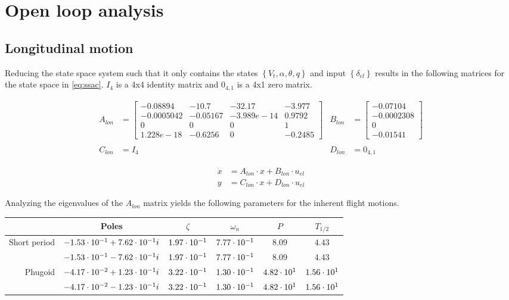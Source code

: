 \section{Open loop analysis}
\subsection{Longitudinal motion}
Reducing the state space system such that it only contains the states $\left \{ V_t, \alpha, \theta, q \right \}$ and input $\left \{ \delta_{el} \right \}$ results in the following matrices for the state space in \autoref{eq:ssac}. $I_4$ is a 4x4 identity matrix and $0_{4,1}$ is a 4x1 zero matrix.

\begin{align*}
    A_{lon}&=\begin{bmatrix}
        -0.08894   &  -10.7   &   -32.17   & -3.977 \\
        -0.0005042 & -0.05167 & -3.989e-14 &   0.9792 \\
                 0 &        0 &          0 &        1 \\
         1.228e-18 &  -0.6256 &          0 &  -0.2485
    \end{bmatrix} &
    B_{lon}&=\begin{bmatrix}
          -0.07104 \\
        -0.0002308 \\
                 0 \\
          -0.01541 
    \end{bmatrix} \\\\
    C_{lon}&=I_4 &
    D_{lon}&=0_{4,1}
\end{align*}

\begin{align}    
    \dot{x} &= A_{lon} \cdot x + B_{lon} \cdot u_{el} \nonumber\\
    y &= C_{lon} \cdot x + D_{lon} \cdot u_{el} \label{eq:ssac}
\end{align}

Analyzing the eigenvalues of the $A_{lon}$ matrix yields the following parameters for the inherent flight motions.

\begin{center}
    \begin{tabular}{ r | c c c c c }
                     & Poles                            & $\zeta$        & $\omega_n$     & $P$           & $T_{1/2}$     \\ \hline \hline
        Short period & $-1.53\cdot 10^{-1} + 7.62\cdot 10^{-1}i$ & $1.97\cdot 10^{-1}$ & $7.77\cdot 10^{-1}$ & $8.09$        & $4.43$        \\  
                     & $-1.53\cdot 10^{-1} - 7.62\cdot 10^{-1}i$ & $1.97\cdot 10^{-1}$ & $7.77\cdot 10^{-1}$ & $8.09$        & $4.43$        \\ \hline
        Phugoid      & $-4.17\cdot 10^{-2} + 1.23\cdot 10^{-1}i$ & $3.22\cdot 10^{-1}$ & $1.30\cdot 10^{-1}$ & $4.82\cdot 10^{1}$ & $1.56\cdot 10^{1}$ \\   
                     & $-4.17\cdot 10^{-2} - 1.23\cdot 10^{-1}i$ & $3.22\cdot 10^{-1}$ & $1.30\cdot 10^{-1}$ & $4.82\cdot 10^{1}$ & $1.56\cdot 10^{1}$
    \end{tabular}
\end{center}


